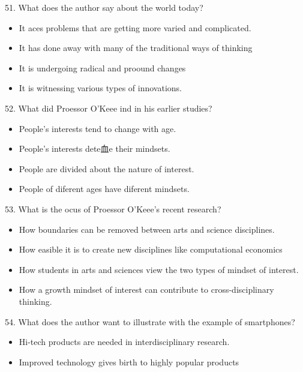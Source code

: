 \documentclass[UTF8,11pt]{ctexart}
\begin{document}
51. What does the author say about the world today?


\begin{itemize}[leftmargin=2em,itemsep=.2em,topsep=.4em]\item[A.] It aces problems that are getting more varied and complicated.
\item[B.] It has done away with many of the traditional ways of thinking
\item[C.] It is undergoing radical and proound changes
\item[D.] It is witnessing various types of innovations.
\end{itemize}

52. What did Proessor O'Keee ind in his earlier studies?


\begin{itemize}[leftmargin=2em,itemsep=.2em,topsep=.4em]\item[A.] People's interests tend to change with age.
\item[B.] People's interests dete血e their mindsets.
\item[C.] People are divided about the nature of interest.
\item[D.] People of diferent ages have diferent mindsets.
\end{itemize}

53. What is the ocus of Proessor O'Keee's recent research?


\begin{itemize}[leftmargin=2em,itemsep=.2em,topsep=.4em]\item[A.] How boundaries can be removed between arts and science disciplines.
\item[B.] How easible it is to create new disciplines like computational economics
\item[C.] How students in arts and sciences view the two types of mindset of interest.
\item[D.] How a growth mindset of interest can contribute to cross-disciplinary thinking.
\end{itemize}

54. What does the author want to illustrate with the example of smartphones?


\begin{itemize}[leftmargin=2em,itemsep=.2em,topsep=.4em]\item[A.] Hi-tech products are needed in interdisciplinary research.
\item[B.] Improved technology gives birth to highly popular products
\end{itemize}
\end{document}
